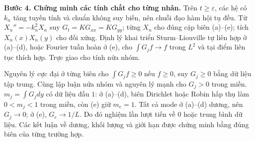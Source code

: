 \textbf{Bước 4. Chứng minh các tính chất cho từng nhân.}
Trên $t\ge\varepsilon$, các hệ có $k_n$ tăng tuyến tính và chuẩn không suy biến, nên chuỗi đạo hàm hội tụ đều. Từ $X_n''=-k_n^2X_n$ suy $G_t=KG_{xx}=KG_{yy}$; từng $X_n$ cho đúng cặp biên (a)--(e); tích $X_n(x)X_n(y)$ cho đối xứng. Định lý khai triển Sturm–Liouville tự liên hợp ở (a)--(d), hoặc Fourier tuần hoàn ở (e), cho $\int G_jf\to f$ trong $L^2$ và tại điểm liên tục thích hợp. Trực giao cho tính nửa nhóm.

Nguyên lý cực đại ở từng biên cho $\int G_jf\ge0$ nếu $f\ge0$, suy $G_j\ge0$ bằng dữ liệu tập trung. Cùng lập luận nửa nhóm và nguyên lý mạnh cho $G_j>0$ trong miền. $m_j=\int G_jdy$ có dữ liệu đầu $1$: ở (a)--(d), biên Dirichlet hoặc Robin hấp thụ làm $0<m_j<1$ trong miền, còn (e) giữ $m_e=1$. Tất cả mode ở (a)--(d) dương, nên $G_j\to0$; ở (e), $G_e\to1/L$. Do đó nghiệm lần lượt tiến về $0$ hoặc trung bình dữ liệu. Các kết luận về dương, khối lượng và giới hạn được chứng minh bằng đúng biên của từng trường hợp.
